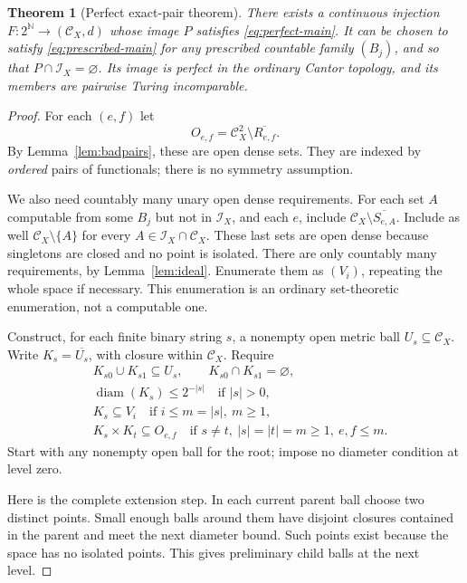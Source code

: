 \documentclass[11pt,a4paper]{article}
\newcommand{\N}{\mathbb N}
\newcommand{\CD}{\mathcal C}
\newcommand{\core}{\mathcal I}
\newcommand{\cl}[1]{\overline{#1}}
\DeclareMathOperator{\diam}{diam}
\newtheorem{theorem}{Theorem}[section]
\theoremstyle{definition}\newtheorem{definition}[theorem]{Definition}
\theoremstyle{remark}\newtheorem{remark}[theorem]{Remark}
\begin{document}
\begin{theorem}[Perfect exact-pair theorem]\label{thm:perfect}
There exists a continuous injection
$F:2^{\N}\longrightarrow(\CD_X,d)$ whose image $P$ satisfies
\eqref{eq:perfect-main}. It can be chosen to satisfy
\eqref{eq:prescribed-main} for any prescribed countable family $(B_j)$, and
so that $P\cap\core_X=\varnothing$. Its image is perfect in the ordinary
Cantor topology, and its members are pairwise Turing incomparable.
\end{theorem}
\begin{proof}
For each $(e,f)$ let
\[
 O_{e,f}=\CD_X^2\setminus\cl{R_{e,f}}.
\]
By Lemma~\ref{lem:badpairs}, these are open dense sets. They are indexed by
\emph{ordered} pairs of functionals; there is no symmetry assumption.

We also need countably many unary open dense requirements. For each set
$A$ computable from some $B_j$ but not in $\core_X$, and each $e$, include
$\CD_X\setminus\cl{S_{e,A}}$. Include as well
$\CD_X\setminus\{A\}$ for every $A\in\core_X\cap\CD_X$. These last sets are
open dense because singletons are closed and no point is isolated. There
are only countably many requirements, by Lemma~\ref{lem:ideal}. Enumerate
them as $(V_i)$, repeating the whole space if necessary. This enumeration is
an ordinary set-theoretic enumeration, not a computable one.

Construct, for each finite binary string $s$, a nonempty open metric ball
$U_s\subseteq\CD_X$. Write $K_s=\cl{U_s}$, with closure within $\CD_X$.
Require
\begin{align}
 &K_{s0}\cup K_{s1}\subseteq U_s,
       \qquad K_{s0}\cap K_{s1}=\varnothing,\label{eq:fusion1}\\
 &\diam(K_s)\le2^{-|s|}\quad\text{if }|s|>0,\label{eq:fusion2}\\
 &K_s\subseteq V_i\quad\text{if }i\le m=|s|,\ m\ge1,\label{eq:fusion3}\\
 &K_s\times K_t\subseteq O_{e,f}\quad
   \text{if }s\ne t,\ |s|=|t|=m\ge1,\ e,f\le m.\label{eq:fusion4}
\end{align}
Start with any nonempty open ball for the root; impose no diameter condition
at level zero.

Here is the complete extension step. In each current parent ball choose two
distinct points. Small enough balls around them have disjoint closures
contained in the parent and meet the next diameter bound. Such points exist
because the space has no isolated points. This gives preliminary child balls
at the next level.


\end{proof}
\end{document}
